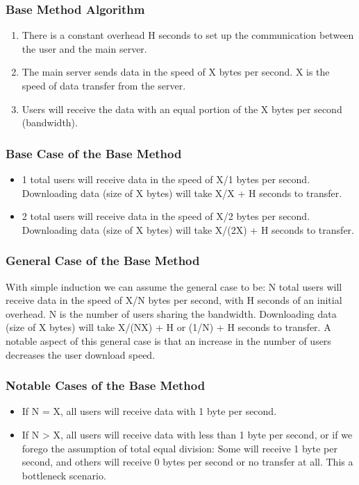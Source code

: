 \documentclass[acmsmall]{acmart}
\begin{document}
\subsubsection{Base Method Algorithm}
\begin{enumerate}
    \item There is a constant overhead H seconds to set up the communication between the user and the main server.
    \item The main server sends data in the speed of X bytes per second. X is the speed of data transfer from the server.
    \item Users will receive the data with an equal portion of the X bytes per second (bandwidth).
\end{enumerate}

\subsubsection{Base Case of the Base Method}
    \begin{itemize} 
        \item 1 total users will receive data in the speed of X/1 bytes per second. Downloading data (size of X bytes) will take X/X + H seconds to transfer.
        \item 2 total users will receive data in the speed of X/2 bytes per second. Downloading data (size of X bytes) will take X/(2X) + H seconds to transfer.
    \end{itemize}

\subsubsection{General Case of the Base Method} 
With simple induction we can assume the general case to be: N total users will receive data in the speed of X/N bytes per second, with H seconds of an initial overhead. N is the number of users sharing the bandwidth. Downloading data (size of X bytes) will take X/(NX) + H or (1/N) + H seconds to transfer. A notable aspect of this general case is that an increase in the number of users decreases the user download speed.

\subsubsection{Notable Cases of the Base Method}
    \begin{itemize} 
        \item If N = X, all users will receive data with 1 byte per second.
        \item If N > X, all users will receive data with less than 1 byte per second, or if we forego the assumption of total equal division: Some will receive 1 byte per second, and others will receive 0 bytes per second or no transfer at all. This a bottleneck scenario.
    \end{itemize}
\end{document}
